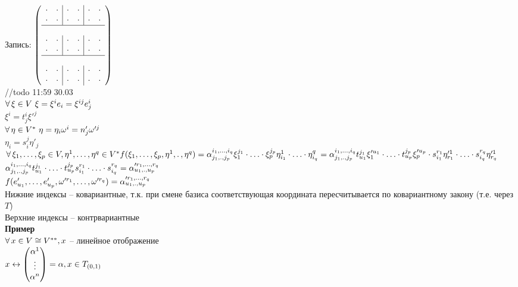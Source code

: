 \documentclass[12pt]{article}
\begin{document}
Запись: $\left(\begin{array}{cc|cc|cc}
    \cdot & \cdot & \cdot & \cdot & \cdot & \cdot\\
    \cdot & \cdot & \cdot & \cdot & \cdot & \cdot\\
    \hline\\
    \cdot & \cdot & \cdot & \cdot & \cdot & \cdot\\
    \cdot & \cdot & \cdot & \cdot & \cdot & \cdot\\
    \hline\\
    \cdot & \cdot & \cdot & \cdot & \cdot & \cdot\\
    \cdot & \cdot & \cdot & \cdot & \cdot & \cdot
\end{array}\right)$\\
//todo 11:59 30.03\\
$\forall\, \xi \in V\ \xi = \xi^i e_i = \xi^{ij}e^i_j$\\
$\xi^i = t^i_j \xi'^j$\\
$\forall\, \eta \in V^*\ \eta=\eta_i \omega^i =n'_j \omega'^j$\\
$\eta_i = s_i^j \eta'_j$\\
$\forall\, \xi_1, \ldots, \xi_p \in V, \eta^1,\ldots,\eta^q \in V^* f(\xi_1, \ldots, \xi_p, \eta^1, \ldotp, \eta^q) = \alpha_{j_1, \ldotp, j_p}^{i_1, \ldots, i_q} \xi_1^{j_1}\cdot \ldots \cdot \xi_p^{j_p} \eta_{i_1}^1\cdot\ldots\cdot \eta_{i_q}^q = \alpha_{j_1, \ldotp, j_p}^{i_1, \ldots, i_q} t_{u_1}^{j_1}\xi_1'^{u_1} \cdot \ldots \cdot t_{u_p}^{j_p}\xi_p'^{u_p} \cdot s_{i_1}^{r_1}\eta'^1_{r_1} \cdot \ldots\cdot s_{i_q}^{r_q}\eta'^1_{r_q}$\\
$\alpha_{j_1, \ldotp, j_p}^{i_1, \ldots, i_q} t_{u_1}^{j_1}\cdot\ldots\cdot t_{u_p}^{j_p} s_{i_1}^{r_1} \cdot \ldots \cdot s_{i_q}^{r_q} = \alpha'^{r_1, \ldots, r_q}_{u_1, \ldotp, u_p}$\\
$f(e'_{u_1}, \ldots, e'_{u_p}, \omega'^{r_1},\ldots, \omega'^{r_q}) = \alpha'^{r_1, \ldots, r_q}_{u_1, \ldotp, u_p}$\\
Нижние индексы -- ковариантные, т.к. при смене базиса соответствующая координата пересчитывается по ковариантному закону (т.е. через $T$)\\
Верхние индексы -- контрвариантные\\
\textbf{Пример}\\
$\forall\, x \in V \cong V^{**}, x$ -- линейное отображение\\
$x \leftrightarrow \begin{pmatrix}
    \alpha^1\\\vdots\\\alpha^n
\end{pmatrix} = \alpha, x \in T_{(0,1)}$\\
\end{document}
